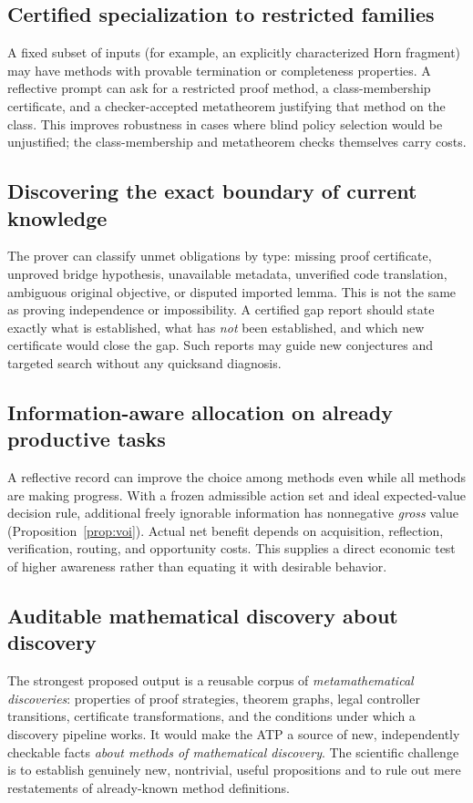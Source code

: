 \documentclass[11pt,letterpaper]{article}
\begin{document}
\subsection{Certified specialization to restricted families}
A fixed subset of inputs (for example, an explicitly characterized Horn fragment) may have methods with provable termination or completeness properties. A reflective prompt can ask for a restricted proof method, a class-membership certificate, and a checker-accepted metatheorem justifying that method on the class. This improves robustness in cases where blind policy selection would be unjustified; the class-membership and metatheorem checks themselves carry costs.

\subsection{Discovering the exact boundary of current knowledge}
The prover can classify unmet obligations by type: missing proof certificate, unproved bridge hypothesis, unavailable metadata, unverified code translation, ambiguous original objective, or disputed imported lemma. This is not the same as proving independence or impossibility. A certified gap report should state exactly what is established, what has \emph{not} been established, and which new certificate would close the gap. Such reports may guide new conjectures and targeted search without any quicksand diagnosis.

\subsection{Information-aware allocation on already productive tasks}
A reflective record can improve the choice among methods even while all methods are making progress. With a frozen admissible action set and ideal expected-value decision rule, additional freely ignorable information has nonnegative \emph{gross} value (Proposition~\ref{prop:voi}). Actual net benefit depends on acquisition, reflection, verification, routing, and opportunity costs. This supplies a direct economic test of higher awareness rather than equating it with desirable behavior.

\subsection{Auditable mathematical discovery about discovery}
The strongest proposed output is a reusable corpus of \emph{metamathematical discoveries}: properties of proof strategies, theorem graphs, legal controller transitions, certificate transformations, and the conditions under which a discovery pipeline works. It would make the ATP a source of new, independently checkable facts \emph{about methods of mathematical discovery}. The scientific challenge is to establish genuinely new, nontrivial, useful propositions and to rule out mere restatements of already-known method definitions.
\end{document}
